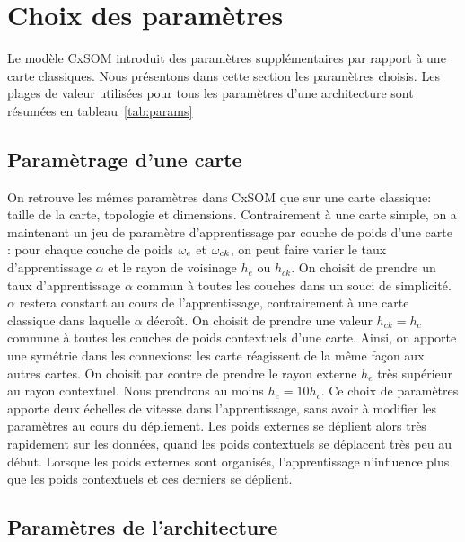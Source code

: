 \section{Choix des paramètres}\label{sec:params}

Le modèle CxSOM introduit des paramètres supplémentaires par rapport à une carte classiques. Nous présentons dans cette section les paramètres choisis. Les plages de valeur utilisées pour tous les paramètres d'une architecture sont résumées en tableau~\ref{tab:params}
\subsection{Paramètrage d'une carte}
On retrouve les mêmes paramètres dans CxSOM que sur une carte classique: taille de la carte, topologie et dimensions. 
Contrairement à une carte simple, on a maintenant un jeu de paramètre d'apprentissage par couche de poids d'une carte : pour chaque couche de poids $\omega_e$ et $\omega_{ck}$, on peut faire varier le taux d'apprentissage $\alpha$ et le rayon de voisinage $h_e$ ou $h_{ck}$.
On choisit de prendre un taux d'apprentissage $\alpha$ commun à toutes les couches dans un souci de simplicité. $\alpha$ restera constant au cours de l'apprentissage, contrairement à une carte classique dans laquelle $\alpha$ décroît.
On choisit de prendre une valeur $h_{ck} = h_c$ commune à toutes les couches de poids contextuels d'une carte. Ainsi, on apporte une symétrie dans les connexions: les carte réagissent de la même façon aux autres cartes.
On choisit par contre de prendre le rayon externe $h_e$ très supérieur au rayon contextuel. Nous prendrons au moins $h_e = 10 h_c$. Ce choix de paramètres apporte deux échelles de vitesse dans l'apprentissage, sans avoir à modifier les paramètres au cours du dépliement. Les poids externes se déplient alors très rapidement sur les données, quand les poids contextuels se déplacent très peu au début. Lorsque les poids externes sont organisés, l'apprentissage n'influence plus que les poids contextuels et ces derniers se déplient. 


\subsection{Paramètres de l'architecture}

